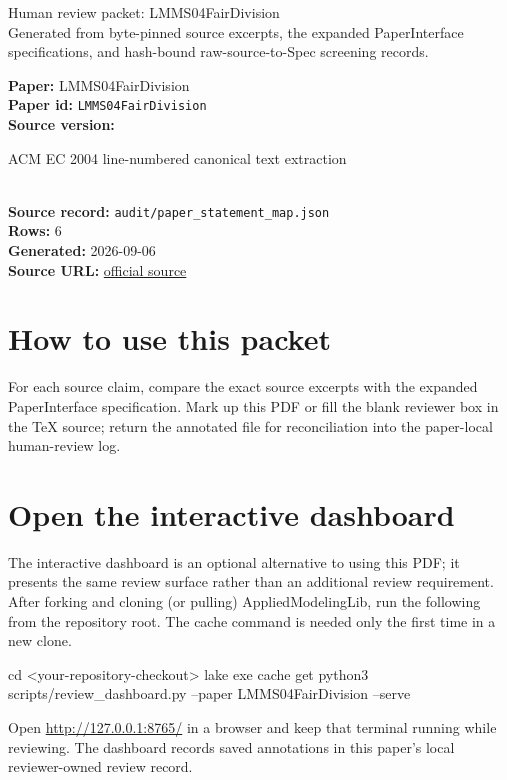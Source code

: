 \documentclass[10pt]{article}
\begin{document}
\fontsize{9}{10}\selectfont

\begin{center}
{\LARGE Human review packet: LMMS04FairDivision}\\[0.35em]
\small Generated from byte-pinned source excerpts, the expanded PaperInterface
specifications, and hash-bound raw-source-to-Spec screening records.
\end{center}

\noindent\textbf{Paper:} LMMS04FairDivision\\
\textbf{Paper id:} \texttt{LMMS04FairDivision}\\
\textbf{Source version:} \parbox[t]{0.76\linewidth}{\raggedright ACM EC 2004 line-numbered canonical text extraction}\\
\textbf{Source record:} \texttt{audit/paper\_statement\_map.json}\\
\textbf{Rows:} 6\\
\textbf{Generated:} 2026-09-06\\
\textbf{Source URL:} \href{https://www.stat.berkeley.edu/~mossel/publications/happy.pdf}{official source}





\section*{How to use this packet}
For each source claim, compare the exact source excerpts with the expanded
PaperInterface specification. Mark up this PDF or fill the blank reviewer box in the TeX source;
return the annotated file for reconciliation into the paper-local human-review
log.

\section*{Open the interactive dashboard}
The interactive dashboard is an optional alternative to using this PDF; it
presents the same review surface rather than an additional review requirement.
After forking and cloning (or pulling) AppliedModelingLib, run the following from the
repository root. The cache command is needed only the first time in a new clone.
\begin{ReviewVerbatim}
cd <your-repository-checkout>
lake exe cache get
python3 scripts/review_dashboard.py --paper LMMS04FairDivision --serve
\end{ReviewVerbatim}
Open \url{http://127.0.0.1:8765/} in a browser and keep that terminal running
while reviewing. The dashboard records saved annotations in this paper's local
reviewer-owned review record.
\end{document}
